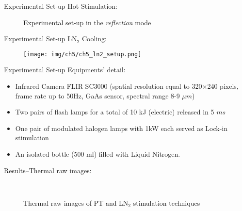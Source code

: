 \begin{frame}{Experimental Set-up}
    Hot Stimulation:
    \begin{figure}
        \centering
       \caption{Experimental set-up in the \textit{reflection} mode}
    \end{figure}

\end{frame}


\begin{frame}{Experimental Set-up}
    LN$_2$ Cooling:
    \begin{figure}
        \centering
        \texttt{[image: img/ch5/ch5\_ln2\_setup.png]}
    \end{figure}

\end{frame}


\begin{frame}{Experimental Set-up}
    Equipments' detail:
    \begin{itemize}
        \item Infrared Camera FLIR SC3000 (spatial resolution equal to 320$\times$240 pixels, frame rate up to 50Hz, GaAs sensor, spectral range 8-9 $\mu m$)
        \item Two pairs of flash lamps for a total of 10 kJ (electric) released in 5 $ms $ 
        \item One pair of modulated halogen lamps with 1kW each served as Lock-in    stimulation   
        \item An isolated bottle (500 ml) filled with  Liquid Nitrogen.
\end{itemize}
\end{frame}


\begin{frame}{Results--\small{Thermal raw images:}}
    \begin{figure}
     \vspace{-18pt}
       \\
       \vspace*{-10pt}
       \caption{Thermal raw images of PT and LN$_2$ stimulation techniques}      
    \end{figure}
\end{frame}


